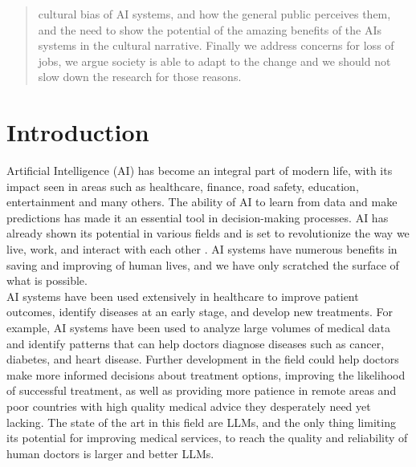 \documentclass{article}
\begin{document}
\begin{abstract}
cultural bias of AI systems, and how the general public perceives them, and the need to show the potential of the amazing benefits of the AIs systems in the cultural narrative. Finally we address concerns for loss of jobs, we argue society is able to adapt to the change and we should not slow down the research for those reasons. 

\end{abstract}
\newpage
\tableofcontents
\newpage
\section{Introduction}

Artificial Intelligence (AI) has become an integral part of modern life, with its impact seen in areas such as healthcare\cite{yang2021intelligent}, finance\cite{wu2023bloomberggpt}, road safety\cite{das2022aihighwaysafety}, education\cite{Kasneci2023ChatGPT}, entertainment\cite{jaiswal2023artificial} and many others\cite{amlta2021proceedings}. The ability of AI to learn from data and make predictions has made it an essential tool in decision-making processes. AI has already shown its potential in various fields and is set to revolutionize the way we live, work, and interact with each other \cite{schwab2016fourth}. AI systems have numerous benefits in saving and improving of human lives, and we have only scratched the surface of what is possible.\cite{lee2018aisuperpowers} \\

AI systems have been used extensively in healthcare to improve patient outcomes, identify diseases at an early stage, and develop new treatments\cite{yang2021intelligent, topol2019high}. For example, AI systems have been used to analyze large volumes of medical data and identify patterns that can help doctors diagnose diseases such as cancer, diabetes, and heart disease\cite{kumar2022artificial}. Further development in the field could help doctors make more informed decisions about treatment options, improving the likelihood of successful treatment\cite{jiang2017artificial}, as well as providing more patience in remote areas and poor countries with high quality medical advice they desperately need yet lacking\cite{guo2018application}. The state of the art in this field are LLMs\cite{singhal2022large}, and the only thing limiting its potential for improving medical services, to reach the quality and reliability of human doctors is larger and better LLMs. \\
\end{document}

